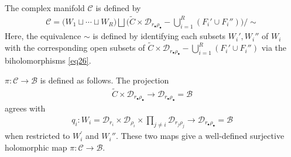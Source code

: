 \documentclass[11pt,b5paper,notitlepage]{article}
\theoremstyle{definition}
\theoremstyle{plain}
\newcommand{\wtd}{\widetilde}
\newcommand{\blt}{\bullet}
\newcommand{\<}{\left\langle}
\renewcommand{\>}{\right\rangle}
\newcommand{\MC}{\mathcal{C}}
\newcommand{\MB}{\mathcal{B}}
\newcommand{\MD}{\mathcal{D}}
\numberwithin{equation}{subsection}
\begin{document}
The complex manifold $\MC$ is defined by 
\begin{gather}
\MC=\big(W_1\sqcup\cdots\sqcup W_R\big)\bigsqcup \big(\wtd C\times \MD_{r_\blt \rho_\blt}-\bigcup_{i=1}^R( F_i'\cup F_i'')\big)\Big/\sim
\end{gather}
Here, the equivalence $\sim$ is defined by identifying each subsets $W_i',W_i''$ of $W_i$ with the corresponding open subsets of $\wtd C\times \MD_{r_\blt \rho_\blt}-\bigcup_{i=1}^R( F_i'\cup F_i'')$ via the biholomorphisms \eqref{eq26}.

$\pi:\MC\rightarrow \MB$ is defined as follows. The projection
\begin{align*}
    \wtd C\times \MD_{r_\blt \rho_\blt}\rightarrow \MD_{r_\blt \rho_\blt}=\MB
\end{align*}
agrees with
\begin{align*}
q_i:W_i=\MD_{r_i}\times \MD_{\rho_i}\times \prod_{j\ne i} \MD_{r_j\rho_j}\rightarrow \MD_{r_\blt \rho_\blt}=\MB
\end{align*}
when restricted to $W_i^\prime$ and $W_i''$. These two maps give a well-defined surjective holomorphic map $\pi:\MC\rightarrow \MB$.
\begin{comment}
    For each $q_\blt=(q_1,\cdots,q_R)\in \MB$, the fiber $\MC_{q_\blt}$ is obtained by removing 
$$
\begin{aligned}
F_j&=\{y\in V_j:\vert \varpi_j(y)\vert\leq \vert q_j\vert/\rho_j\},\\
F_j^\prime&=\{y\in V_j^\prime:\vert \varpi_j^\prime(y)\vert \leq \vert q_j\vert /r_j\},
\end{aligned}
$$
from $\wtd C$, and gluing the remaining part of $\wtd C$ by identifying $y\in V_j$ with $y^\prime\in V_j^\prime$ if $\varpi_j(y)\varpi_j^\prime(y^\prime)=q_j$.
\end{comment}
\end{document}
